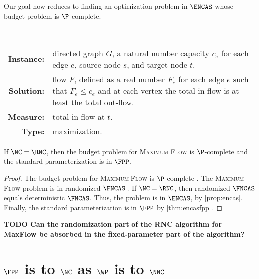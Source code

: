 \documentclass{article}
\newcommand{\todo}[1]{\textbf{TODO #1}}
\begin{document}
Our goal now reduces to finding an optimization problem in $\ENCAS$ whose budget problem is $\P$-complete.

\begin{definition}
  \mbox{} \\
  \begin{tabular}{r p{9.2cm}}
    \textbf{Instance:} & directed graph $G$, a natural number capacity $c_e$ for each edge $e$, source node $s$, and target node $t$. \\
    \textbf{Solution:} & flow $F$, defined as a real number $F_e$ for each edge $e$ such that $F_e \leq c_e$ and at each vertex the total in-flow is at least the total out-flow. \\
    \textbf{Measure:} & total in-flow at $t$. \\
    \textbf{Type:} & maximization.
  \end{tabular}
\end{definition}


\begin{theorem}
  If $\NC = \RNC$, then the budget problem for \textsc{Maximum Flow} is $\P$-complete and the standard parameterization is in $\FPP$.
\end{theorem}
\begin{proof}
  The budget problem for \textsc{Maximum Flow} is $\P$-complete \autocite[Problem~A.4.4]{ghr95}.
  The \textsc{Maximum Flow} problem is in randomized $\FNCAS$ \autocite[Theorem~4.5.2]{dsst97}.
  If $\NC = \RNC$, then randomized $\FNCAS$ equals deterministic $\FNCAS$.
  Thus, the problem is in $\ENCAS$, by \autoref{prop:encas}.
  Finally, the standard parameterization is in $\FPP$ by \autoref{thm:encasfpp}.
\end{proof}

\todo{Can the randomization part of the RNC algorithm for MaxFlow be absorbed in the fixed-parameter part of the algorithm?}


\section{\texorpdfstring{$\FPP$}{FPP} is to \texorpdfstring{$\NC$}{NC} as \texorpdfstring{$\WP$}{WP} is to \texorpdfstring{$\NNC$}{NNC}}
\end{document}
